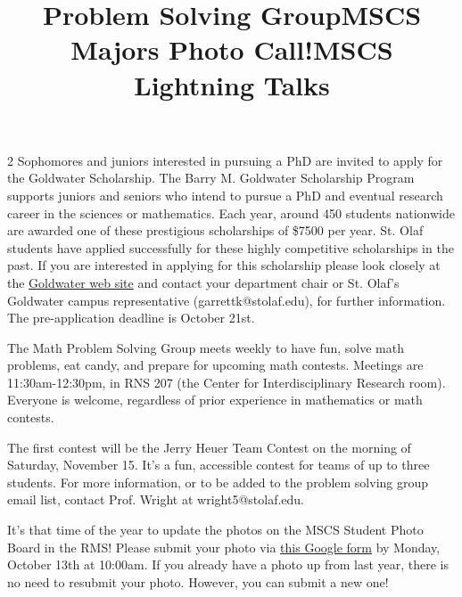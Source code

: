 \documentclass[12pt]{article}
\newcommand{\bolder}{\textbf}
\begin{document}
\begin{multicols}{2}
Sophomores and juniors interested in pursuing a PhD are invited to apply for the Goldwater Scholarship. The Barry M. Goldwater Scholarship Program supports juniors and seniors who intend to pursue a PhD and eventual research career in the sciences or mathematics.  Each year, around 450 students nationwide are awarded one of these prestigious scholarships of \$7500 per year. St. Olaf students have applied successfully for these highly competitive scholarships in the past. If you are interested in applying for this scholarship please look closely at the \href{https://goldwaterscholarship.gov/}{Goldwater web site} and contact your department chair or St. Olaf’s Goldwater campus representative (garrettk@stolaf.edu), for further information. The pre-application deadline is October 21st.

\begin{tcolorbox}[colback=white, colframe=black]
    \begin{center}
    \title{{\large \bolder{Problem Solving Group}}}
    \end{center}
\end{tcolorbox}
The Math Problem Solving Group meets weekly to have fun, solve math problems, eat candy, and prepare for upcoming math contests. Meetings are 11:30am-12:30pm, in RNS 207 (the Center for Interdisciplinary Research room). Everyone is welcome, regardless of prior experience in mathematics or math contests.

The first contest will be the Jerry Heuer Team Contest on the morning of Saturday, November 15. It's a fun, accessible contest for teams of up to three students. For more information, or to be added to the problem solving group email list, contact Prof. Wright at wright5@stolaf.edu.


\begin{tcolorbox}[colback=white, colframe=black]
    \begin{center}
    \title{{\large \bolder{MSCS Majors Photo Call!}}}
    \end{center}
\end{tcolorbox}

It's that time of the year to update the photos on the MSCS Student Photo Board in the RMS! Please submit your photo via \href{https://forms.gle/kHtQ3YUga6BG5rjp9}{this Google form} by Monday, October 13th at 10:00am. If you already have a photo up from last year, there is no need to resubmit your photo. However, you can submit a new one!


\begin{tcolorbox}[colback=white, colframe=black]
    \begin{center}
    \title{{\large \bolder{MSCS Lightning Talks}}}
    \end{center}
\end{tcolorbox}


\end{multicols}
\end{document}
